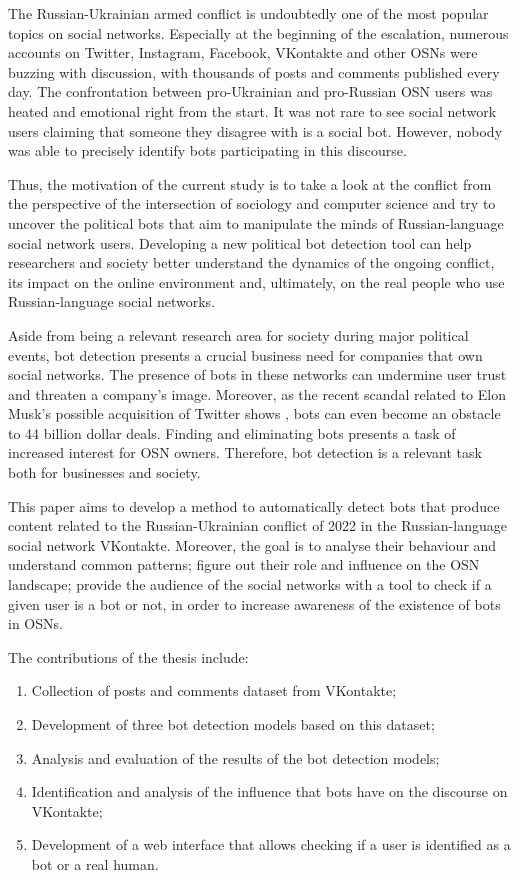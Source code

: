 The Russian-Ukrainian armed conflict is undoubtedly one of the most popular topics on social networks. Especially at the beginning of the escalation, numerous accounts on Twitter, Instagram, Facebook, VKontakte and other OSNs were buzzing with discussion, with thousands of posts and comments published every day. The confrontation between pro-Ukrainian and pro-Russian OSN users was heated and emotional right from the start. It was not rare to see social network users claiming that someone they disagree with is a social bot. However, nobody was able to precisely identify bots participating in this discourse. 

Thus, the motivation of the current study is to take a look at the conflict from the perspective of the intersection of sociology and computer science and try to uncover the political bots that aim to manipulate the minds of Russian-language social network users. Developing a new political bot detection tool can help researchers and society better understand the dynamics of the ongoing conflict, its impact on the online environment and, ultimately, on the real people who use Russian-language social networks.

Aside from being a relevant research area for society during major political events, bot detection presents a crucial business need for companies that own social networks. The presence of bots in these networks can undermine user trust and threaten a company's image. Moreover, as the recent scandal related to Elon Musk's possible acquisition of Twitter shows \cite{Zahn2022}, bots can even become an obstacle to 44 billion dollar deals. Finding and eliminating bots presents a task of increased interest for OSN owners. Therefore, bot detection is a relevant task both for businesses and society.

This paper aims to develop a method to automatically detect bots that produce content related to the Russian-Ukrainian conflict of 2022 in the Russian-language social network VKontakte. Moreover, the goal is to analyse their behaviour and understand common patterns; figure out their role and influence on the OSN landscape; provide the audience of the social networks with a tool to check if a given user is a bot or not, in order to increase awareness of the existence of bots in OSNs.

The contributions of the thesis include:
\begin{enumerate}
    \item Collection of posts and comments dataset from VKontakte;
    \item Development of three bot detection models based on this dataset;
    \item Analysis and evaluation of the results of the bot detection models;
    \item Identification and analysis of the influence that bots have on the discourse on VKontakte;
    \item Development of a web interface that allows checking if a user is identified as a bot or a real human.
\end{enumerate}


